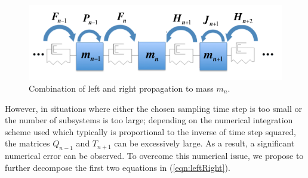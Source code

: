 \documentclass[11pt]{ucthesis}
\begin{document}
\begin{figure}[thpb]
\centering
\includegraphics[width=1\linewidth]{Figures/left_to_right.png}
\caption{Combination of left and right propagation to mass $m_n$.}
\label{left_2_right}
\end{figure}

However, in situations where either the chosen sampling time step is too small or the number of subsystems is too large; depending on the numerical integration scheme used which typically is proportional to the inverse of time step squared, the matrices $Q_{n-1}$ and $T_{n+1}$ can be excessively large. As a result, a significant numerical error can be observed. To overcome this numerical issue, we propose to further decompose the first two equations in (\ref{eqn:leftRight}).
\end{document}

